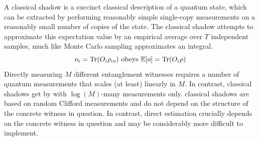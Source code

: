 \documentclass[
reprint,
aps,
pra,
floatfix,
]{revtex4-2}
\theoremstyle{plain}
\theoremstyle{definition}
\newtheorem{definition}{Definition}
\newcommand{\dm}{\rho}
\newcommand{\cs}{\text{cs}}
\begin{document}
A classical shadow is a succinct classical description of a quantum state, which can be extracted by performing reasonably simple single-copy measurements on a reasonably small number of copies of the state.
The classical shadow attempts to approximate this expectation value by an empirical average over $T$ independent samples, much like Monte Carlo sampling approximates an integral.
	\begin{equation}
		o_i = \Tr(O_i \dm_{\cs})
		\text{ obeys }
		\expectation[o] =\Tr(O_i \dm)
	\end{equation}
Directly measuring $M$ different entanglement witnesses requires a number of quantum measurements that scales (at least) linearly in $M$. In contrast, classical shadows get by with $\log(M)$-many measurements only.
classical shadows are based on random Clifford measurements and do not depend on the structure of the concrete witness in question. In contrast, direct estimation crucially depends on the concrete witness in question and may be considerably more difficult to implement.


\end{document}
